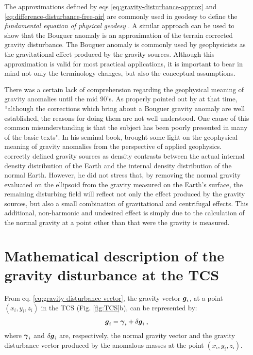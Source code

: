 \documentclass[extra]{gji}
\begin{document}
The approximations defined by eqs \ref{eq:gravity-disturbance-approx}
and \ref{eq:difference-disturbance-free-air} are commonly used
in geodesy to define the \textit{fundamental equation of physical
geodesy} \citep{hofmann-wellenhof-moritz2005}.
A similar approach can be used to show that the Bouguer anomaly
is an approximation of the terrain corrected gravity disturbance.
The Bouguer anomaly is commonly used by geophysicists as the
gravitational effect produced by the gravity sources.
Although this approximation is valid for most practical applications,
it is important to bear in mind not only the terminology
changes, but also the conceptual assumptions.

There was a certain lack of comprehension regarding the
geophysical meaning of gravity anomalies until the
mid 90's.
As properly pointed out by \citet{chapin1996} at that time,
``although the corrections which bring about a Bouguer
gravity anomaly are well established, the reasons for doing
them are not well understood. One cause of this common
misunderstanding is that the subject has been poorly presented in
many of the basic texts".
In his seminal book, \citet{blakely1996} brought some light
on the geophysical meaning of gravity anomalies from the
perspective of applied geophysics. \citet{blakely1996} correctly
defined gravity sources as density contrasts between the actual
internal density distribution of the Earth and the internal density
distribution of the normal Earth.
However, he did not stress that, by removing the normal gravity
evaluated on the ellipsoid from the gravity measured
on the Earth's surface, the remaining disturbing field will reflect
not only the effect produced by the gravity sources, but also a
small combination of gravitational and centrifugal effects.
This additional, non-harmonic and undesired effect is
simply due to the calculation of the normal gravity at a point
other than that were the gravity is measured.


\section{Mathematical description of the gravity disturbance at the TCS}

From eq. \ref{eq:gravity-disturbance-vector}, the gravity vector $\mitbf{g}_{i}$, at a point
$(x_{i}, y_{i}, z_{i})$ in the TCS (Fig. \ref{fig:TCS}b), can be represented by:
\begin{equation}
\mitbf{g}_{i} = \mitbf{\gamma}_{i} + \delta \mitbf{g}_{i} \: ,
\label{eq:gravity-vector-TCS}
\end{equation}
where $\mitbf{\gamma}_{i}$ and $\delta \mitbf{g}_{i}$
are, respectively, the normal gravity vector and the
gravity disturbance vector produced by the anomalous
masses at the point $(x_{i}, y_{i}, z_{i})$.
\end{document}
